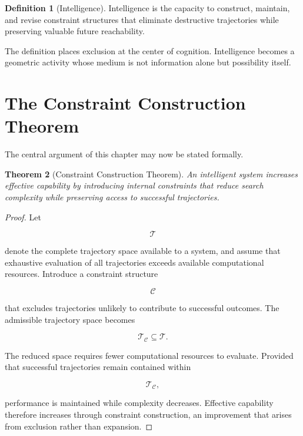 \documentclass[11pt,oneside]{book}
\theoremstyle{plain}
\newtheorem{theorem}{Theorem}[chapter]
\theoremstyle{definition}
\newtheorem{definition}[theorem]{Definition}
\theoremstyle{remark}
\begin{document}
\begin{definition}[Intelligence]
Intelligence is the capacity to construct, maintain, and revise constraint structures that eliminate destructive trajectories while preserving valuable future reachability.
\end{definition}

The definition places exclusion at the center of cognition. Intelligence becomes a geometric activity whose medium is not information alone but possibility itself.

\section{The Constraint Construction Theorem}

The central argument of this chapter may now be stated formally.

\begin{theorem}[Constraint Construction Theorem]
An intelligent system increases effective capability by introducing internal constraints that reduce search complexity while preserving access to successful trajectories.
\end{theorem}

\begin{proof}
Let

\begin{equation}
\mathcal{T}
\end{equation}

denote the complete trajectory space available to a system, and assume that exhaustive evaluation of all trajectories exceeds available computational resources. Introduce a constraint structure

\begin{equation}
\mathcal{C}
\end{equation}

that excludes trajectories unlikely to contribute to successful outcomes. The admissible trajectory space becomes

\begin{equation}
\mathcal{T}_{\mathcal{C}}
\subseteq
\mathcal{T}.
\end{equation}

The reduced space requires fewer computational resources to evaluate. Provided that successful trajectories remain contained within

\begin{equation}
\mathcal{T}_{\mathcal{C}},
\end{equation}

performance is maintained while complexity decreases. Effective capability therefore increases through constraint construction, an improvement that arises from exclusion rather than expansion.
\end{proof}
\end{document}
